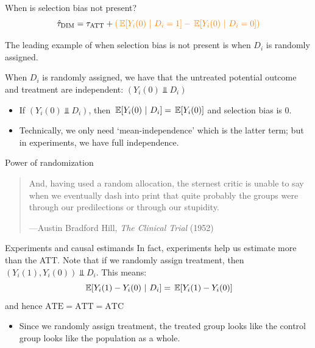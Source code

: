 \documentclass[aspectratio=169,t,11pt,table]{beamer}
\begin{document}
\begin{frame}{When is selection bias not present?}
  \vspace*{-\bigskipamount}
  $$
    \hat{\tau}_{\text{DIM}} = \tau_{\text{ATT}} + {\color{orange} \left( \expec{Y_{i}(0)}{D_i = 1} - \expec{Y_{i}(0)}{D_i = 0} \right) }
  $$

  \bigskip
  The leading example of when selection bias is not present is when $D_i$ is randomly assigned.
  
  \pause
  \bigskip
  When $D_i$ is randomly assigned, we have that the untreated potential outcome and treatment are independent: $(Y_i(0) \Perp D_i)$
  \begin{itemize}
    \item If $(Y_i(0) \Perp D_i)$, then $\expec{Y_{i}(0)}{D_i} = \expec{Y_{i}(0)}$ and selection bias is 0.

    \pause 
    \item Technically, we only need `mean-independence' which is the latter term; but in experiments, we have full independence.
  \end{itemize}
\end{frame}

\begin{frame}[fragile]{Power of randomization}
  \bigskip
  \begin{quote}
    And, having used a random allocation, the sternest critic is unable to say when we eventually dash into print that quite probably the groups were  through our predilections or through our stupidity.

    \bigskip
    \textnormal{—Austin Bradford Hill, \emph{The Clinical Trial} (1952)}
  \end{quote}

\end{frame}

\begin{frame}{Experiments and causal estimands}
  In fact, experiments help us estimate more than the ATT. Note that if we randomly assign treatment, then $(Y_i(1), Y_i(0)) \Perp D_i$. This means: 
  $$
    \expec{Y_i(1) - Y_i(0)}{D_i} = \expec{Y_i(1) - Y_i(0)}
  $$
  and hence $\text{ATE} = \text{ATT} = \text{ATC}$

  \begin{itemize}
    \item Since we randomly assign treatment, the treated group looks like the control group looks like the population as a whole.
  \end{itemize}
\end{frame}
\end{document}
